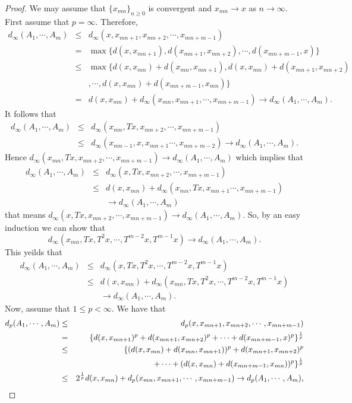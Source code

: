 \documentclass[10pt,a4paper]{amsart}
\begin{document}
\begin{proof}
We may assume that  $\{x_{mn}\}_{n\geq0}$ is convergent and $x_{mn}\to x$ as $n\to\infty$. First assume that $p=\infty$. Therefore,
\begin{eqnarray*}
d_\infty(A_1,\cdots,A_m)&\leq& d_\infty(x,x_{mn+1},x_{mn+2},\cdots,x_{mn+m-1})\\
&=&\max\{d(x,x_{mn+1}),d(x_{mn+1},x_{mn+2}),\cdots,d(x_{mn+m-1},x)\}\\
&\leq&\max\{d(x,x_{mn})+d(x_{mn},x_{mn+1}),d(x,x_{mn})+d(x_{mn+1},x_{mn+2})\\&&,\cdots,d(x,x_{mn})+d(x_{mn+m-1},x_{mn})\}\\&=&d(x,x_{mn})+d_\infty(x_{mn},x_{mn+1},\cdots,x_{mn+m-1})\to d_\infty(A_1,\cdots,A_m).
\end{eqnarray*}
It follows that
\begin{eqnarray*}
d_\infty(A_1,\cdots,A_m)&\leq& d_\infty(x_{mn},Tx,x_{mn+2},\cdots,x_{mn+m-1})\\
&\leq&d_\infty(x_{mn-1},x,x_{mn+1}\cdots,x_{mn+m-2})\to d_\infty(A_1,\cdots,A_m).
\end{eqnarray*}
Hence $d_\infty(x_{mn},Tx,x_{mn+2},\cdots,x_{mn+m-1})\to d_\infty(A_1,\cdots,A_m)$ which implies that
\begin{eqnarray*}
d_\infty(A_1,\cdots,A_m)&\leq& d_\infty(x,Tx,x_{mn+2},\cdots,x_{mn+m-1})\\
&\leq&d(x,x_{mn})+d_\infty(x_{mn},Tx,x_{mn+1}\cdots,x_{mn+m-1})\\&&\to d_\infty(A_1,\cdots,A_m)
\end{eqnarray*}
that means $d_\infty(x,Tx,x_{mn+2},\cdots,x_{mn+m-1})\to d_\infty(A_1,\cdots,A_m)$. So, by an easy induction we can show that
$$d_\infty(x_{mn},Tx,T^2x,\cdots,T^{m-2}x,T^{m-1}x)\to d_\infty(A_1,\cdots,A_m).$$
This yeilds that
\begin{eqnarray*}
d_\infty(A_1,\cdots,A_m)&\leq&d_\infty(x,Tx,T^2x,\cdots,T^{m-2}x,T^{m-1}x)\\
&\leq&d(x,x_{mn})+d_\infty(x_{mn},Tx,T^2x,\cdots,T^{m-2}x,T^{m-1}x)\\&&\to d_\infty(A_1,\cdots,A_m).
\end{eqnarray*}
Now, assume that $1\leq p<\infty$. We have that
\begin{eqnarray*}
d_p(A_1,\cdots,A_m)&\leq& d_p(x,x_{mn+1},x_{mn+2},\cdots,x_{mn+m-1})\\
&=&\{d(x,x_{mn+1})^p+d(x_{mn+1},x_{mn+2})^p+\cdots+d(x_{mn+m-1},x)^p\}^{1\over p}\\
&\leq&\{(d(x,x_{mn})+d(x_{mn},x_{mn+1}))^p+d(x_{mn+1},x_{mn+2})^p\\&&+\cdots+(d(x,x_{mn})+d(x_{mn+m-1},x_{mn}))^p\}^{1\over p}\\&\leq&2^{1\over p}d(x,x_{mn})+d_p(x_{mn},x_{mn+1},\cdots,x_{mn+m-1})\to d_p(A_1,\cdots,A_m),

\end{eqnarray*}
\end{proof}
\end{document}
